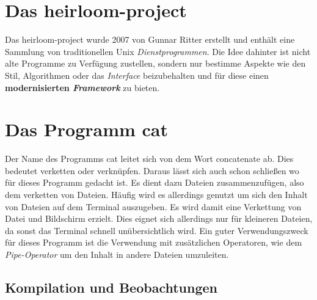 \section{Das heirloom-project}
Das heirloom-project wurde 2007 von Gunnar Ritter erstellt und enthält eine Sammlung von traditionellen Unix \textit{Dienstprogrammen}. Die Idee dahinter ist nicht alte Programme zu Verfügung zustellen, sondern nur bestimme Aspekte wie den Stil, Algorithmen oder das \textit{Interface} beizubehalten und für diese einen \textbf{modernisierten \textit{Framework}} zu bieten.

\section{Das Programm cat}
Der Name des Programms cat leitet sich von dem Wort concatenate ab. Dies bedeutet verketten oder verknüpfen. Daraus lässt sich auch schon schließen wo für dieses Programm gedacht ist. Es dient dazu Dateien zusammenzufügen, also dem verketten von Dateien. Häufig wird es allerdings genutzt um sich den Inhalt von Dateien auf dem Terminal auszugeben. Es wird damit eine Verkettung von Datei und Bildschirm erzielt. Dies eignet sich allerdings nur für kleineren Dateien, da sonst das Terminal schnell unübersichtlich wird. Ein guter Verwendungszweck für dieses Programm ist die Verwendung mit zusätzlichen Operatoren, wie dem \textit{Pipe-Operator} um den Inhalt in andere Dateien umzuleiten.

\subsection{Kompilation und Beobachtungen}

